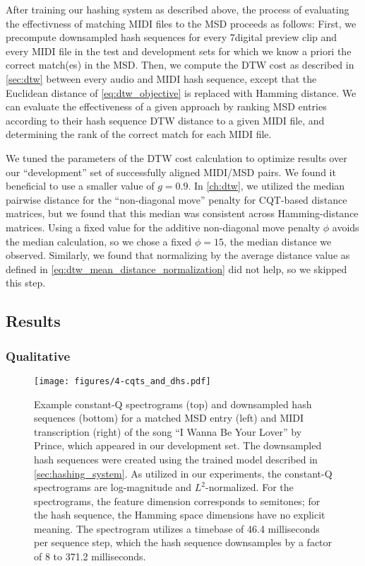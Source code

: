 After training our hashing system as described above, the process of evaluating the effectivness of matching MIDI files to the MSD proceeds as follows:
First, we precompute downsampled hash sequences for every 7digital preview clip and every MIDI file in the test and development sets for which we know a priori the correct match(es) in the MSD.
Then, we compute the DTW cost as described in \cref{sec:dtw} between every audio and MIDI hash sequence, except that the Euclidean distance of \cref{eq:dtw_objective} is replaced with Hamming distance.
We can evaluate the effectiveness of a given approach by ranking MSD entries according to their hash sequence DTW distance to a given MIDI file, and determining the rank of the correct match for each MIDI file.

We tuned the parameters of the DTW cost calculation to optimize results over our ``development'' set of successfully aligned MIDI/MSD pairs.
We found it beneficial to use a smaller value of $g = 0.9$.
In \cref{ch:dtw}, we utilized the median pairwise distance for the ``non-diagonal move'' penalty for CQT-based distance matrices, but we found that this median was consistent across Hamming-distance matrices.
Using a fixed value for the additive non-diagonal move penalty $\phi$ avoids the median calculation, so we chose a fixed $\phi = 15$, the median distance we observed.
Similarly, we found that normalizing by the average distance value as defined in \cref{eq:dtw_mean_distance_normalization} did not help, so we skipped this step.

\subsection{Results}

\subsubsection{Qualitative}

\begin{figure}
  \texttt{[image: figures/4-cqts\_and\_dhs.pdf]}
  \caption[Spectrograms and downsampled hash sequences for a matching pair]{Example constant-Q spectrograms (top) and downsampled hash sequences (bottom) for a matched MSD entry (left) and MIDI transcription (right) of the song ``I Wanna Be Your Lover'' by Prince, which appeared in our development set.
The downsampled hash sequences were created using the trained model described in \cref{sec:hashing_system}.
As utilized in our experiments, the constant-Q spectrograms are log-magnitude and $L^2$-normalized.
For the spectrograms, the feature dimension corresponds to semitones; for the hash sequence, the Hamming space dimensions have no explicit meaning.
The spectrogram utilizes a timebase of 46.4 milliseconds per sequence step, which the hash sequence downsamples by a factor of 8 to 371.2 milliseconds.}
  \label{fig:cqts_and_dhs}
\end{figure}

